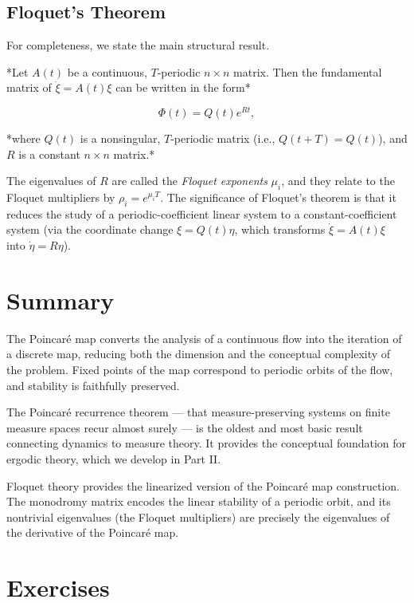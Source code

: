 \subsection{Floquet's Theorem}\label{sec:4.7.5}

For completeness, we state the main structural result.

\begin{theorem}[Floquet]\label{thm:4.13}
*Let $A(t)$ be a continuous, $T$-periodic $n \times n$ matrix. Then the fundamental matrix of $\dot{\xi} = A(t)\xi$ can be written in the form*

\[
\Phi(t) = Q(t) e^{Rt},
\]

*where $Q(t)$ is a nonsingular, $T$-periodic matrix (i.e., $Q(t + T) = Q(t)$), and $R$ is a constant $n \times n$ matrix.*

The eigenvalues of $R$ are called the \textit{Floquet exponents} $\mu_i$, and they relate to the Floquet multipliers by $\rho_i = e^{\mu_i T}$. The significance of Floquet's theorem is that it reduces the study of a periodic-coefficient linear system to a constant-coefficient system (via the coordinate change $\xi = Q(t)\eta$, which transforms $\dot{\xi} = A(t)\xi$ into $\dot{\eta} = R\eta$).
\end{theorem}


\section{Summary}\label{sec:4.8}

The Poincaré map converts the analysis of a continuous flow into the iteration of a discrete map, reducing both the dimension and the conceptual complexity of the problem. Fixed points of the map correspond to periodic orbits of the flow, and stability is faithfully preserved.

The Poincaré recurrence theorem --- that measure-preserving systems on finite measure spaces recur almost surely --- is the oldest and most basic result connecting dynamics to measure theory. It provides the conceptual foundation for ergodic theory, which we develop in Part II.

Floquet theory provides the linearized version of the Poincaré map construction. The monodromy matrix encodes the linear stability of a periodic orbit, and its nontrivial eigenvalues (the Floquet multipliers) are precisely the eigenvalues of the derivative of the Poincaré map.


\section*{Exercises}

